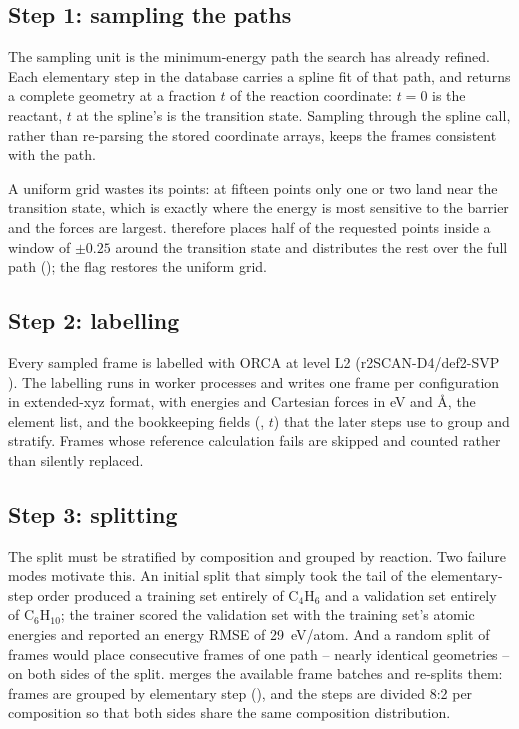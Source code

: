 \subsection{Step 1: sampling the paths}
\label{sec:al-sample}

The sampling unit is the minimum-energy path the search has already refined.
Each elementary step in the database carries a spline fit of that path, and
 returns a complete geometry at a fraction $t$ of the
reaction coordinate: $t=0$ is the reactant, $t$ at the spline's
 is the transition state.  Sampling through the spline call,
rather than re-parsing the stored coordinate arrays, keeps the frames
consistent with the path.

A uniform grid wastes its points: at fifteen points only one or two land near
the transition state, which is exactly where the energy is most sensitive to
the barrier and the forces are largest.   therefore
places half of the requested points inside a window of $\pm0.25$ around the
transition state and distributes the rest over the full path
(); the  flag restores the uniform
grid.

\subsection{Step 2: labelling}
\label{sec:al-label}

Every sampled frame is labelled with ORCA at level L2
(r2SCAN-D4/def2-SVP \cite{furness2020r2scan,caldeweyher2019d4,neese2022orca}).
The labelling runs in worker processes and writes one frame per configuration
in extended-xyz format, with energies and Cartesian forces in eV and \AA, the
element list, and the bookkeeping fields (, $t$) that the later
steps use to group and stratify.  Frames whose reference calculation fails are
skipped and counted rather than silently replaced.

\subsection{Step 3: splitting}
\label{sec:al-split}

The split must be stratified by composition and grouped by reaction.  Two
failure modes motivate this.  An initial split that simply took the tail of
the elementary-step order produced a training set entirely of C$_4$H$_6$ and a
validation set entirely of C$_6$H$_{10}$; the trainer scored the validation
set with the training set's atomic energies and reported an energy RMSE of
29~eV/atom.  And a random split of frames would place consecutive frames of
one path -- nearly identical geometries -- on both sides of the split.
 merges the available frame batches and re-splits
them: frames are grouped by elementary step (), and the steps are
divided 8:2 per composition so that both sides share the same composition
distribution.

